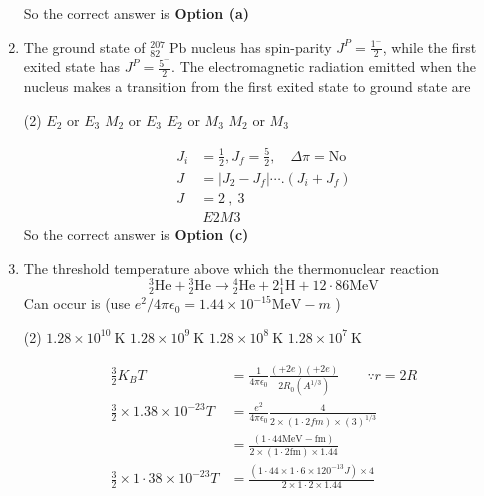 \begin{enumerate}
\begin{answer}
$$$$
	So the correct answer is \textbf{Option (a)}
\end{answer}
	\item The ground state of ${ }_{82}^{207} \mathrm{~Pb}$ nucleus has spin-parity $J^P=\frac{1^{-}}{2}$, while the first exited state has $J^P=\frac{5^{-}}{2}$. The electromagnetic radiation emitted when the nucleus makes a transition from the first exited state to ground state are
 \begin{tasks}(2)
	\task[\textbf{a.}]$E_2$ or $E_3$
	\task[\textbf{b.}] $M_2$ or $E_3$
	\task[\textbf{c.}]$E_2$ or $M_3$
	\task[\textbf{d.}] $M_2$ or $M_3$	
\end{tasks}
\begin{answer}
	$$
	\begin{aligned}
	J_i&=\frac{1}{2}, J_f=\frac{5}{2}, \quad \Delta \pi=\mathrm{No}\\
	J&=\left|J_2-J_f\right| \cdots .\left(J_i+J_f\right) \\
	J&=2\ ,\ 3\\
&	\ E 2 M 3
\end{aligned}
$$
	So the correct answer is \textbf{Option (c)}
\end{answer}
	\item The threshold temperature above which the thermonuclear reaction
$$
{ }_2^3 \mathrm{He}+{ }_2^3 \mathrm{He} \rightarrow{ }_2^4 \mathrm{He}+2{ }_1^1 \mathrm{H}+12 \cdot 86 \mathrm{MeV}
$$
Can occur is (use $e^2 / 4 \pi \epsilon_0=1.44 \times 10^{-15} \mathrm{MeV}-m$ )
 \begin{tasks}(2)
	\task[\textbf{a.}]$1.28 \times 10^{10} \mathrm{~K}$
	\task[\textbf{b.}]$1.28 \times 10^9 \mathrm{~K}$
	\task[\textbf{c.}] $1.28 \times 10^8 \mathrm{~K}$
	\task[\textbf{d.}] $1.28 \times 10^7 \mathrm{~K}$
\end{tasks}
\begin{answer}
	$$
	\begin{aligned}
	\frac{3}{2} K_B T&=\frac{1}{4 \pi \epsilon_0} \frac{(+2 e)(+2 e)}{2 R_0\left(A^{1 / 3}\right)} \qquad \because r=2 R\\
	\frac{3}{2} \times 1.38 \times 10^{-23} T &=\frac{e^2}{4 \pi \epsilon_0} \frac{4}{2 \times(1 \cdot 2 f m) \times(3)^{1 / 3}} \\
	&= \frac{(1 \cdot 44 \mathrm{MeV}-\mathrm{fm})}{2 \times(1 \cdot 2 \mathrm{fm}) \times 1.44}\\
	\frac{3}{2} \times 1 \cdot 38 \times 10^{-23} T &=\frac{\left(1 \cdot 44 \times 1 \cdot 6 \times 120^{-13} J\right) \times 4}{2 \times 1 \cdot 2 \times 1.44} \\

\end{aligned}$$
\end{answer}
\end{enumerate}
